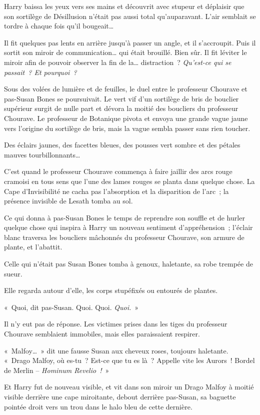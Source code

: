 Harry baissa les yeux vers ses mains et découvrit avec stupeur et déplaisir que son sortilège de Désillusion n'était pas aussi total qu'auparavant. L'air semblait se tordre à chaque fois qu'il bougeait…

Il fit quelques pas lents en arrière jusqu'à passer un angle, et il s'accroupit. Puis il sortit son miroir de communication… qui était brouillé. Bien sûr. Il fit léviter le miroir afin de pouvoir observer la fin de la… distraction~? \emph{Qu'est-ce qui se passait~? Et pourquoi~?}

Sous des volées de lumière et de feuilles, le duel entre le professeur Chourave et pas-Susan Bones se poursuivait. Le vert vif d'un sortilège de bris de bouclier supérieur surgit de nulle part et dévora la moitié des boucliers du professeur Chourave. Le professeur de Botanique pivota et envoya une grande vague jaune vers l'origine du sortilège de bris, mais la vague sembla passer sans rien toucher.

Des éclairs jaunes, des facettes bleues, des pousses vert sombre et des pétales mauves tourbillonnants…

C'est quand le professeur Chourave commença à faire jaillir des arcs rouge cramoisi en tous sens que l'une des lames rouges se planta dans quelque chose. La Cape d'Invisibilité ne cacha pas l'absorption et la disparition de l'arc~; la présence invisible de Lesath tomba au sol.

Ce qui donna à pas-Susan Bones le temps de reprendre son souffle et de hurler quelque chose qui inspira à Harry un nouveau sentiment d'appréhension~; l'éclair blanc traversa les boucliers mâchonnés du professeur Chourave, son armure de plante, et l'abattit.

Celle qui n'était pas Susan Bones tomba à genoux, haletante, sa robe trempée de sueur.

Elle regarda autour d'elle, les corps stupéfixés ou entourés de plantes.

«~Quoi, dit pas-Susan. Quoi. Quoi. \emph{Quoi.}~»

Il n'y eut pas de réponse. Les victimes prises dans les tiges du professeur Chourave semblaient immobiles, mais elles paraissaient respirer.

«~Malfoy…~» dit une fausse Susan aux cheveux roses, toujours haletante. «~Drago Malfoy, où es-tu~? Est-ce que tu es là~? Appelle vite les Aurors~! Bordel de Merlin -- \emph{Hominum Revelio~!}~»

Et Harry fut de nouveau visible, et vit dans son miroir un Drago Malfoy à moitié visible derrière une cape miroitante, debout derrière pas-Susan, sa baguette pointée droit vers un trou dans le halo bleu de cette dernière.

